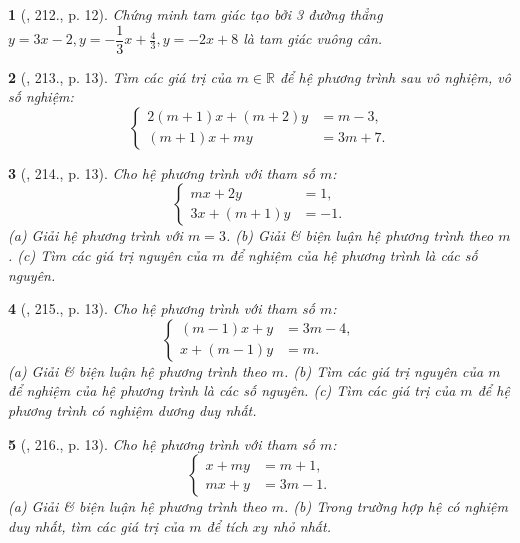 \documentclass{article}
\newtheorem{baitoan}{}
\begin{document}
\begin{baitoan}[\cite{Binh_Toan_9_tap_2}, 212., p. 12]
	Chứng minh tam giác tạo bởi 3 đường thẳng $y = 3x - 2,y = -\dfrac{1}{3}x + \frac{4}{3},y = -2x + 8$ là tam giác vuông cân.
\end{baitoan}

\begin{baitoan}[\cite{Binh_Toan_9_tap_2}, 213., p. 13]
	Tìm các giá trị của $m\in\mathbb{R}$ để hệ phương trình sau vô nghiệm, vô số nghiệm:
	\begin{equation*}
		\left\{\begin{split}
			2(m + 1)x + (m + 2)y &= m - 3,\\
			(m + 1)x + my &= 3m + 7.
		\end{split}\right.
	\end{equation*}
\end{baitoan}

\begin{baitoan}[\cite{Binh_Toan_9_tap_2}, 214., p. 13]
	Cho hệ phương trình với tham số $m$:
	\begin{equation*}
		\left\{\begin{split}
			mx + 2y &= 1,\\
			3x + (m + 1)y &= -1.
		\end{split}\right.
	\end{equation*}
	(a) Giải hệ phương trình với $m = 3$. (b) Giải \& biện luận hệ phương trình theo $m$. (c) Tìm các giá trị nguyên của $m$ để nghiệm của hệ phương trình là các số nguyên.
\end{baitoan}

\begin{baitoan}[\cite{Binh_Toan_9_tap_2}, 215., p. 13]
	Cho hệ phương trình với tham số $m$:
	\begin{equation*}
		\left\{\begin{split}
			(m - 1)x + y &= 3m - 4,\\
			x + (m - 1)y &= m.
		\end{split}\right.
	\end{equation*}
	(a) Giải \& biện luận hệ phương trình theo $m$. (b) Tìm các giá trị nguyên của $m$ để nghiệm của hệ phương trình là các số nguyên. (c) Tìm các giá trị của $m$ để hệ phương trình có nghiệm dương duy nhất.
\end{baitoan}

\begin{baitoan}[\cite{Binh_Toan_9_tap_2}, 216., p. 13]
	Cho hệ phương trình với tham số $m$:
	\begin{equation*}
		\left\{\begin{split}
			x + my &= m + 1,\\
			mx + y &= 3m - 1.
		\end{split}\right.
	\end{equation*}
	(a) Giải \& biện luận hệ phương trình theo $m$. (b) Trong trường hợp hệ có nghiệm duy nhất, tìm các giá trị của $m$ để tích $xy$ nhỏ nhất.
\end{baitoan}
\end{document}
